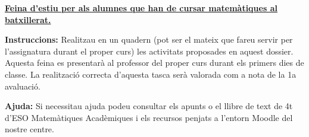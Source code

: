 \documentclass[11pt, a4paper, pdf]{article}
\begin{document}
\pagestyle{blocfancy}
\setcounter{myenumi}{0}
\begin{center}
	\large
	\textbf{\underline{
	Feina d'estiu per als alumnes que han de cursar matemàtiques al batxillerat.
	}
	}
\end{center}



\begin{blueshaded}
		\textbf{Instruccions: } Realitzau en un quadern (pot ser el mateix que fareu servir per l'assignatura durant el proper curs) les activitats proposades en aquest dossier. Aquesta feina es presentarà al professor del proper curs durant els primers dies de classe. La realització correcta d'aquesta tasca serà valorada com a nota de la 1a avaluació.
		
		\textbf{Ajuda: } Si necessitau ajuda podeu consultar els apunts o el llibre de text de 4t d'ESO Matemàtiques Acadèmiques i els recursos penjats a l'entorn Moodle del nostre centre. 
\end{blueshaded}
\end{document}
